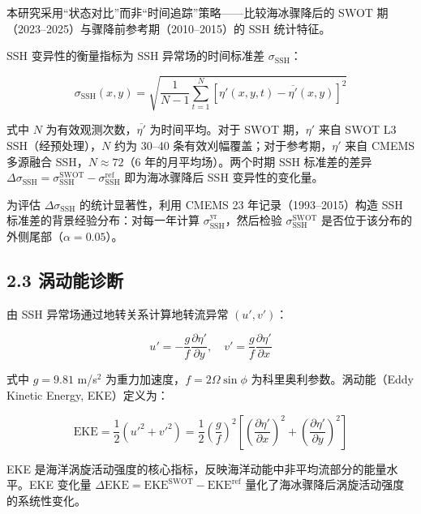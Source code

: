 \documentclass[11pt,a4paper]{article}
\begin{document}
本研究采用``状态对比''而非``时间追踪''策略——比较海冰骤降后的 SWOT 期（2023--2025）与骤降前参考期（2010--2015）的 SSH 统计特征。

SSH 变异性的衡量指标为 SSH 异常场的时间标准差 $\sigma_{\text{SSH}}$：

\begin{equation}
\sigma_{\text{SSH}}(x,y) = \sqrt{\frac{1}{N-1}\sum_{t=1}^{N}[\eta'(x,y,t) - \overline{\eta'}(x,y)]^2}
\end{equation}

式中 $N$ 为有效观测次数，$\overline{\eta'}$ 为时间平均。对于 SWOT 期，$\eta'$ 来自 SWOT L3 SSH（经预处理），$N$ 约为 30--40 条有效刈幅覆盖；对于参考期，$\eta'$ 来自 CMEMS 多源融合 SSH，$N \approx 72$（6 年的月平均场）。两个时期 SSH 标准差的差异 $\Delta\sigma_{\text{SSH}} = \sigma_{\text{SSH}}^{\text{SWOT}} - \sigma_{\text{SSH}}^{\text{ref}}$ 即为海冰骤降后 SSH 变异性的变化量。\par

为评估 $\Delta\sigma_{\text{SSH}}$ 的统计显著性，利用 CMEMS 23 年记录（1993--2015）构造 SSH 标准差的背景经验分布：对每一年计算 $\sigma_{\text{SSH}}^{\text{yr}}$，然后检验 $\sigma_{\text{SSH}}^{\text{SWOT}}$ 是否位于该分布的外侧尾部（$\alpha = 0.05$）。\par

\subsection*{2.3  涡动能诊断}

由 SSH 异常场通过地转关系计算地转流异常 $(u', v')$：

\begin{equation}
u' = -\frac{g}{f}\frac{\partial\eta'}{\partial y},\quad
v' = \frac{g}{f}\frac{\partial\eta'}{\partial x}
\end{equation}

式中 $g = 9.81$ m/s$^2$ 为重力加速度，$f = 2\Omega\sin\phi$ 为科里奥利参数。涡动能（Eddy Kinetic Energy, EKE）定义为：

\begin{equation}
\text{EKE} = \frac{1}{2}\left(u'^{2} + v'^{2}\right)
= \frac{1}{2}\left(\frac{g}{f}\right)^2\left[\left(\frac{\partial\eta'}{\partial x}\right)^2 + \left(\frac{\partial\eta'}{\partial y}\right)^2\right]
\end{equation}

EKE 是海洋涡旋活动强度的核心指标，反映海洋动能中非平均流部分的能量水平。EKE 变化量 $\Delta\text{EKE} = \text{EKE}^{\text{SWOT}} - \text{EKE}^{\text{ref}}$ 量化了海冰骤降后涡旋活动强度的系统性变化。\par
\end{document}
